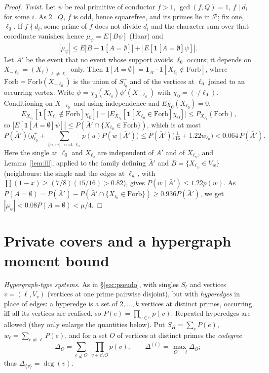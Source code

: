\documentclass[11pt,reqno]{amsart}
\theoremstyle{definition}
\begin{document}
\begin{proof}
\emph{Twist.}  Let $\psi$ be real primitive of conductor $f>1$, $\gcd(f,Q)=1$,
$f\mid d_i$ for some $i$.  As $2\mid Q$, $f$ is odd, hence squarefree, and its
primes lie in $\mathcal P$; fix one, $\ell_0$.  If $f\nmid d_i$, some prime of $f$
does not divide $d_i$ and the character sum over that coordinate vanishes;
hence $\mu_\psi=E[B\psi]$ (Haar) and
\[
 |\mu_\psi|\le E|B-\mathbf 1[A=\emptyset]|+|E[\mathbf 1[A=\emptyset]\psi]|.
\]
Let $\bar A'$ be the event that no event whose support avoids $\ell_0$ occurs;
it depends on $X_{-\ell_0}=(X_\ell)_{\ell\ne\ell_0}$ only.  Then
$\mathbf 1[A=\emptyset]=\mathbf 1_{\bar A'}\cdot\mathbf 1[X_{\ell_0}\notin\mathrm{Forb}]$, where
$\mathrm{Forb}=\mathrm{Forb}(X_{-\ell_0})$ is the union of $S^+_{\ell_0}$ and of the
vertices at $\ell_0$ joined to an occurring vertex.  Write
$\psi=\chi_0(X_{\ell_0})\psi'(X_{-\ell_0})$ with $\chi_0=(\cdot/\ell_0)$.  Conditioning on
$X_{-\ell_0}$ and using independence and $E\chi_0(X_{\ell_0})=0$,
\[
 \big|E_{X_{\ell_0}}[\mathbf 1[X_{\ell_0}\notin\mathrm{Forb}]\chi_0]\big|
 =\big|E_{X_{\ell_0}}[\mathbf 1[X_{\ell_0}\in\mathrm{Forb}]\chi_0]\big|
 \le P_{X_{\ell_0}}(\mathrm{Forb}),
\]
so $|E[\mathbf 1[A=\emptyset]\psi]|\le P(\bar A'\cap\{X_{\ell_0}\in\mathrm{Forb}\})$, which is at most
\[
 P(\bar A')\Big(g^+_{\ell_0}+\sum_{\{u,w\},\,u\text{ at }\ell_0}p(u)P(w\mid\bar A')\Big)
 \le P(\bar A')\big(\tfrac1{16}+1.22w_{\ell_0}\big)<0.064\,P(\bar A').
\]
Here the single at $\ell_0$ and $X_{\ell_0}$ are independent of $\bar A'$ and of
$X_{\ell_w}$, and Lemma~\ref{lem:lll}, applied to the family defining $\bar A'$ and
$B=\{X_{\ell_w}\in V_w\}$ (neighbours: the single and the edges at $\ell_w$, with
$\prod(1-x)\ge(7/8)(15/16)>0.82$), gives $P(w\mid\bar A')\le1.22p(w)$.  As
$P(A=\emptyset)=P(\bar A')-P(\bar A'\cap\{X_{\ell_0}\in\mathrm{Forb}\})\ge0.936P(\bar A')$, we get
$|\mu_\psi|<0.08P(A=\emptyset)<\mu/4$.
\end{proof}

\section{Private covers and a hypergraph moment bound}\label{sec:hyper}

\emph{Hypergraph-type systems.}  As in \S\ref{sec:pseudo}, with singles
$S_\ell$ and vertices $v=(\ell,V_v)$ (vertices at one prime pairwise
disjoint), but with \emph{hyperedges} in place of edges: a hyperedge is a set
of $2,\dots,k$ vertices at distinct primes, occurring iff all its vertices are
realised, so $P(e)=\prod_{v\in e}p(v)$.  Repeated hyperedges are allowed (they
only enlarge the quantities below).  Put $S_H=\sum_eP(e)$,
$w_\ell=\sum_{e\text{ at }\ell}P(e)$, and for a set $O$ of vertices at distinct
primes the \emph{codegree}
\[
 \Delta_O=\sum_{e\supsetneq O}\ \prod_{v\in e\setminus O}p(v),\qquad
 \Delta^{(i)}=\max_{|O|=i}\Delta_O;
\]
thus $\Delta_{\{v\}}=\deg(v)$.
\end{document}
